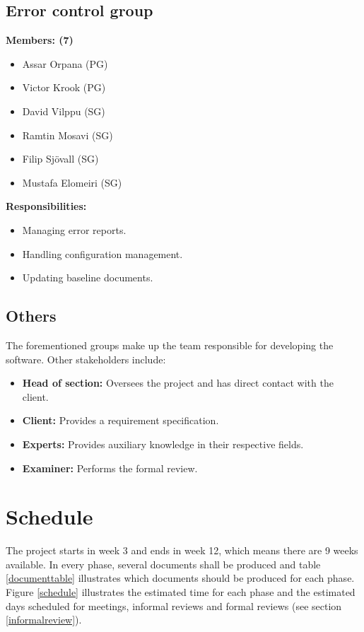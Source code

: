 \documentclass{article}
\begin{document}
    \subsection{Error control group}
        \textbf{Members: (7)}
        \begin{itemize}
            \item Assar Orpana (PG)
            \item Victor Krook (PG)
            \item David Vilppu (SG)
            \item Ramtin Mosavi (SG)
            \item Filip Sjövall (SG)
            \item Mustafa Elomeiri (SG)
        \end{itemize}
        \textbf{Responsibilities: }
        \begin{itemize}
            \item Managing error reports.
            \item Handling configuration management. 
            \item Updating baseline documents.  
        \end{itemize}

    \subsection{Others}
        The forementioned groups make up the team responsible for developing the software. Other stakeholders include:
        \begin{itemize}
            \item \textbf{Head of section:} Oversees the project and has direct contact with the client. 
            \item \textbf{Client:} Provides a requirement specification.
            \item \textbf{Experts:} Provides auxiliary knowledge in their respective fields.
            \item \textbf{Examiner:} Performs the formal review.
        \end{itemize}

\section{Schedule}
    The project starts in week 3 and ends in week 12, which means there are 9 weeks available. In every phase, several documents shall be produced and table \ref{documenttable} illustrates which documents should be produced for each phase. Figure \ref{schedule} illustrates the estimated time for each phase and the estimated days scheduled for meetings, informal reviews and formal reviews (see section \ref{informalreview}).
    
\end{document}
